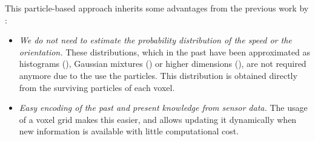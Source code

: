 
This particle-based approach inherits some advantages from the previous work by \cite{danescu2012particle}:
\begin{itemize}
 \item \emph{We do not need to estimate the probability distribution of the speed or the orientation.} These distributions, which in the past have been approximated as histograms (\cite{chen2006dynamic}), Gaussian mixtures (\cite{gindele2009bayesian}) or higher dimensions (\cite{coue2006bayesian}), are not required anymore due to the use the particles. This distribution is obtained directly from the surviving particles of each voxel. 
 \item \emph{Easy encoding of the past and present knowledge from sensor data.} The usage of a voxel grid makes this easier, and allows updating it dynamically when new information is available with little computational cost.
\end{itemize}

